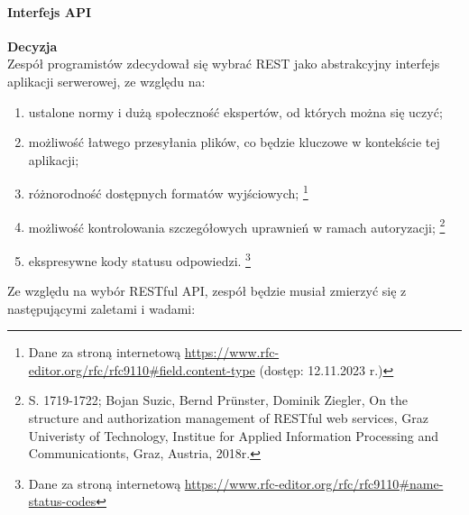 \documentclass[12pt, a4paper, twoside, openany]{book}
\newcommand{\forceindent}{\leavevmode{\parindent=1.3em\indent}}
\begin{document}
\paragraph{Interfejs API\\}
\forceindent \textbf{Decyzja}\\
\forceindent Zespół programistów zdecydował się wybrać REST jako abstrakcyjny interfejs aplikacji serwerowej, ze względu na:
\begin{enumerate}[label=--]
    \item ustalone normy i dużą społeczność ekspertów, od których można się uczyć;
    \item możliwość łatwego przesyłania plików, co będzie kluczowe w kontekście tej aplikacji;
    \item różnorodność dostępnych formatów wyjściowych; \footnote{Dane za stroną internetową \url{https://www.rfc-editor.org/rfc/rfc9110#field.content-type} (dostęp: 12.11.2023 r.)}
    \item możliwość kontrolowania szczegółowych uprawnień w ramach autoryzacji; \footnote{S. 1719-1722; Bojan Suzic, Bernd Prünster, Dominik Ziegler, On the structure and authorization management of RESTful web services, Graz Univeristy of Technology, Institue for Applied Information Processing and Communicationts, Graz, Austria, 2018r.}
    \item ekspresywne kody statusu odpowiedzi. \footnote{Dane za stroną internetową \url{https://www.rfc-editor.org/rfc/rfc9110#name-status-codes}}
\end{enumerate}

Ze względu na wybór RESTful API, zespół będzie musiał zmierzyć się z następującymi zaletami i wadami:
\end{document}
